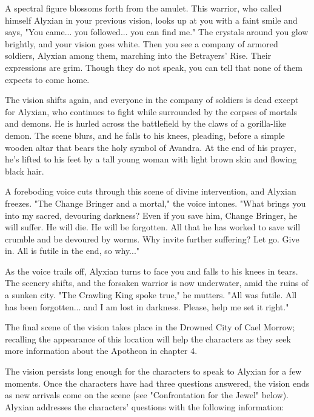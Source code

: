 \documentclass[10pt,a4paper,twoside,bg=print,twocolumn,openany,nodeprecatedcode]{dndbook}
\begin{document}
\begin{DndReadAloud}{}
A spectral figure blossoms forth from the amulet. This warrior, who called himself Alyxian in your previous vision, looks up at you with a faint smile and says, "You came... you followed... you can find me." The crystals around you glow brightly, and your vision goes white. Then you see a company of armored soldiers, Alyxian among them, marching into the Betrayers' Rise. Their expressions are grim. Though they do not speak, you can tell that none of them expects to come home.

The vision shifts again, and everyone in the company of soldiers is dead except for Alyxian, who continues to fight while surrounded by the corpses of mortals and demons. He is hurled across the battlefield by the claws of a gorilla-like demon. The scene blurs, and he falls to his knees, pleading, before a simple wooden altar that bears the holy symbol of Avandra. At the end of his prayer, he's lifted to his feet by a tall young woman with light brown skin and flowing black hair.

A foreboding voice cuts through this scene of divine intervention, and Alyxian freezes. "The Change Bringer and a mortal," the voice intones. "What brings you into my sacred, devouring darkness? Even if you save him, Change Bringer, he will suffer. He will die. He will be forgotten. All that he has worked to save will crumble and be devoured by worms. Why invite further suffering? Let go. Give in. All is futile in the end, so why..."

As the voice trails off, Alyxian turns to face you and falls to his knees in tears. The scenery shifts, and the forsaken warrior is now underwater, amid the ruins of a sunken city. "The Crawling King spoke true," he mutters. "All was futile. All has been forgotten... and I am lost in darkness. Please, help me set it right."

\end{DndReadAloud}

The final scene of the vision takes place in the Drowned City of Cael Morrow; recalling the appearance of this location will help the characters as they seek more information about the Apotheon in chapter 4.

The vision persists long enough for the characters to speak to Alyxian for a few moments. Once the characters have had three questions answered, the vision ends as new arrivals come on the scene (see "Confrontation for the Jewel" below). Alyxian addresses the characters' questions with the following information:
\end{document}
